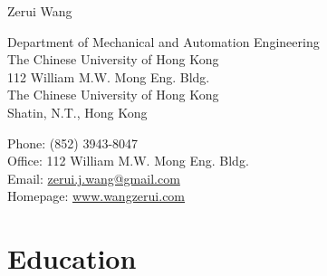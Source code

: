 \documentclass[10pt,letterpaper]{article}
\def\name{Zerui Wang}
\begin{document}
{\huge \name}


\bigskip

\begin{minipage}[t]{0.595\textwidth}
  Department of Mechanical and Automation Engineering \\
  The Chinese University of Hong Kong \\
  112 William M.W. Mong Eng. Bldg. \\
  The Chinese University of Hong Kong \\
  Shatin, N.T., Hong Kong
\end{minipage}
\begin{minipage}[t]{0.395\textwidth}
  Phone: (852) 3943-8047 \\
  Office: 112 William M.W. Mong Eng. Bldg. \\
  Email: \href{mailto:zerui.j.wang@gmail.com}{zerui.j.wang@gmail.com} \\
  Homepage: \href{http://www.wangzerui.com/}{www.wangzerui.com}
\end{minipage}

\section*{Education}
\end{document}

